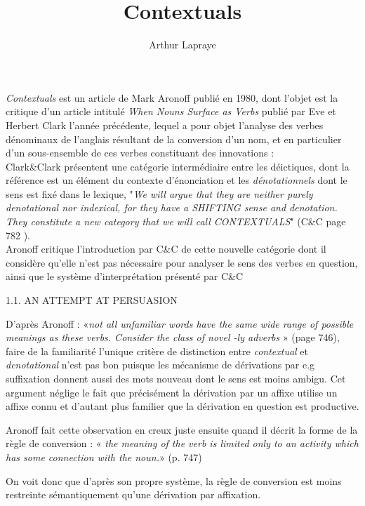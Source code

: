 \documentclass[a4paper,12pt]{article}
\author{Arthur Lapraye}
\title{Contextuals}
\begin{document}
 
 \maketitle
 

 \textit{Contextuals} est un article de Mark Aronoff publié en 1980, dont l'objet est la critique d'un article intitulé \textit{When Nouns Surface as Verbs} publié par Eve et Herbert Clark l'année précédente, lequel a pour objet l'analyse des verbes dénominaux
 de l'anglais résultant de la conversion d'un nom, et en particulier d'un sous-ensemble de ces verbes constituant des innovations : \\
 Clark\&Clark présentent une catégorie intermédiaire entre les déictiques, dont la référence est un élément du contexte d'énonciation et les \textit{dénotationnels} dont le sens est fixé dans le lexique, 
 "\textit{We will argue that they are neither purely denotational nor indexical, for they have a SHIFTING sense and denotation. They constitute a new category that we will call CONTEXTUALS}" (C\&C page 782 ). \\
 Aronoff critique l'introduction par C\&C de cette nouvelle catégorie dont il considère qu'elle n'est pas nécessaire pour analyser le sens des verbes en question, ainsi que le système d'interprétation présenté par C\&C
 
 1.1. AN ATTEMPT AT PERSUASION
 
 
D'après Aronoff : 
«\textit{not all unfamiliar words have the same wide range of possible meanings as these
verbs. Consider the class of novel -ly adverbs} » (page 746), faire de la familiarité l'unique critère de distinction entre \textit{contextual} et \textit{denotational} 
n'est pas bon puisque les mécanisme de dérivations par e.g suffixation donnent aussi des mots nouveau dont le sens est moins ambigu. 
Cet argument néglige le fait que précisément la dérivation par un affixe utilise un affixe connu 
et d'autant plus familier que la dérivation en question est productive.



Aronoff fait cette observation en creux juste ensuite quand il décrit la forme de la règle de conversion : 
« \textit{the meaning of the verb is limited only to an activity which has some connection with the noun.}» (p. 747) 

On voit donc que d'après son propre système, la règle de conversion est moins restreinte sémantiquement qu'une dérivation par affixation. 
\end{document}
